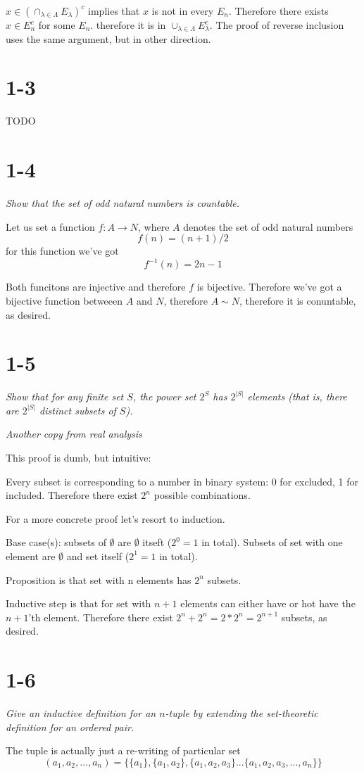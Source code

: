 \documentclass[11pt,oneside,titlepage]{book}
\begin{document}
$x \in \left(\cap_{\lambda \in \Lambda} E_\lambda \right)^c$ implies that
$x$ is not in every $E_n$. Therefore there exists $x \in E_n^c$ for some $E_n$.
therefore it is in $\cup_{\lambda \in \Lambda} E_\lambda^c$. The proof of
reverse inclusion uses the same argument, but in other direction.

\section*{1-3}
TODO

\section*{1-4}
\textit{Show that the set of odd natural numbers is countable.}

Let us set a function $f: A \to N$, where $A$ denotes the set of
odd natural numbers
$$f(n) = (n + 1) / 2$$
for this function  we've got
$$f^{-1}(n) = 2n - 1$$

Both funcitons are injective and therefore $f$ is bijective. Therefore
we've got a bijective function betweeen $A$ and $N$, therefore
$A \sim N$, therefore it is conuntable, as desired.

\section*{1-5}
\textit{Show that for any finite set $S$, the power set $2^S$ has
  $2^{|S|}$ elements (that is, there are $2^{|S|}$ distinct subsets of $S$).}

\textit{Another copy from real analysis}

This proof is dumb, but intuitive:

Every subset is corresponding to a number in binary system: 0 for excluded,
1 for included. Therefore there exist $2^n$ possible combinations.

For a more concrete proof let's resort to induction.

Base case(s): subsets of $\emptyset$ are $\emptyset$ itseft
($2^0 = 1$ in total). Subsets of
set with one element are $\emptyset$ and set itself ($2^1 = 1$ in total).

Proposition is that set with n elements has $2^n$ subsets.

Inductive step is that for set with $n + 1$ elements can either have or hot
have the $n + 1$'th element. Therefore there exist $2^n + 2^n = 2 * 2^n =
2^{n + 1}$ subsets, as desired.

\section*{1-6}
\textit{Give an inductive definition for an $n$-tuple by extending the
  set-theoretic definition for an ordered pair.}

The tuple is actually just a re-writing of particular set
$$(a_1, a_2, ..., a_n) = \{\{a_1\}, \{a_1, a_2\}, \{a_1, a_2, a_3\} ...
\{a_1, a_2, a_3, ..., a_n\}\}$$
\end{document}

